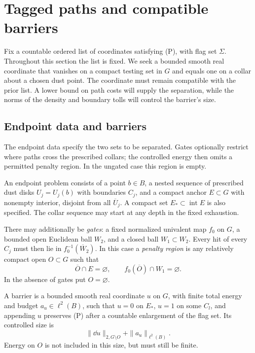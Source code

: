 \section{Tagged paths and compatible barriers}\label{sec:barriers}

Fix a countable ordered list of coordinates satisfying \textup{(P)}, with
flag set $\Sigma$.  Throughout this section the list is fixed.  We seek a
bounded smooth real coordinate that vanishes on a compact testing set
in $G$ and equals one on a collar about a chosen dust point.  The
coordinate must remain compatible with the prior list.  A lower bound on
path costs will supply the separation, while the norms of the density and
boundary tolls will control the barrier's size.

\subsection{Endpoint data and barriers}

The endpoint data specify the two sets to be separated.  Gates optionally
restrict where paths cross the prescribed collars; the controlled energy
then omits a permitted penalty region.  In the ungated case this region
is empty.

\begin{definition}\label{def:endpoint}
An endpoint problem consists of a point $b\in B$, a nested sequence
of prescribed dust disks $U_j=U_j(b)$ with boundaries $C_j$, and a
compact anchor $E\subset G$ with nonempty interior, disjoint from
all $\overline U_j$.  A compact set $E_*\subset\operatorname{int}E$
is also specified.  The collar sequence may start at any depth in the
fixed exhaustion.

There may additionally be \emph{gates}: a fixed normalized univalent
map $f_0$ on $G$, a bounded open Euclidean ball $W_2$, and a closed
ball $W_1\subset W_2$.  Every hit of every $C_j$ must then lie in
$f_0^{-1}(\overline W_2)$.  In this case a \emph{penalty region} is
any relatively compact open $O\subset G$ such that
\[
 \overline O\cap E=\varnothing,
 \qquad f_0(\overline O)\cap W_1=\varnothing.
\]
In the absence of gates put $O=\varnothing$.

A barrier is a bounded smooth real coordinate $u$ on $G$, with finite
total energy and budget $a_u\in\ell^2(B)$, such that $u=0$ on $E_*$,
$u=1$ on some $C_l$, and appending $u$ preserves \textup{(P)} after a
countable enlargement of the flag set.  Its controlled size is
\[
 \|\dd u\|_{2,G\setminus O}+\|a_u\|_{\ell^2(B)}.
\]
Energy on $O$ is not included in this size, but must still be finite.
\end{definition}

